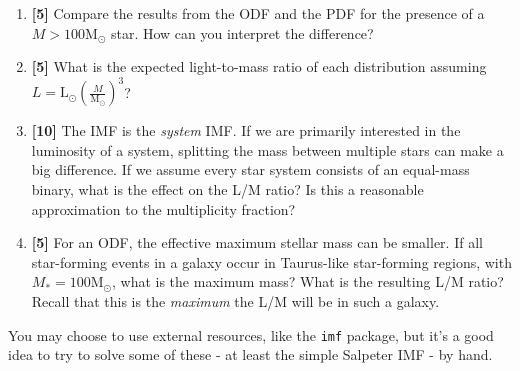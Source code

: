 \documentclass{article}
\newcommand{\msun}{\ensuremath{\mathrm{M}_\odot}\xspace}
\newcommand{\lsun}{\ensuremath{\mathrm{L}_\odot}\xspace}
\begin{document}
\begin{enumerate}
\begin{enumerate}
            of forming a star of a given mass.  What is the minimum cluster mass
            required to have a $>95\%$ ($>63.21\%$) probability of forming at least one $\geq100$
            \msun star?\\
            Recall that the likelihood of rolling at least one six after 100 rolls
            is equal to one minus the likelihood of rolling \emph{no} sixes in 100 rolls
            i.e., $P(\ge 1 \epsdice{6}) = 1- \left(\frac{5}{6}\right)^{100}$.
        \item \textbf{[5]} Compare the results from the ODF and the PDF for the presence of
            a $M>100\msun$ star.  How can you interpret the difference?
        \item \textbf{[5]} What is the expected light-to-mass ratio of each distribution
            assuming $L = \lsun \left(\frac{M}{\msun}\right)^{3}$?
        \item \textbf{[10]} The IMF is the \emph{system} IMF.  If we are primarily interested
            in the luminosity of a system, splitting the mass between multiple
            stars can make a big difference.  If we assume every star system
            consists of an equal-mass binary, what is the effect on the L/M ratio?
            Is this a reasonable approximation to the multiplicity fraction?
        \item \textbf{[5]} For an ODF, the effective maximum stellar mass can be smaller.
            If all star-forming events in a galaxy occur in Taurus-like
            star-forming regions, with $M_*=100\msun$, what is the maximum
            mass?  What is the resulting L/M ratio?  Recall that this is
            the \emph{maximum} the L/M will be in such a galaxy.
    \end{enumerate}

    You may choose to use external resources, like the \texttt{imf} package,
    but it's a good idea to try to solve some of these - at least the simple
    Salpeter IMF - by hand.

\end{enumerate}
\end{document}
